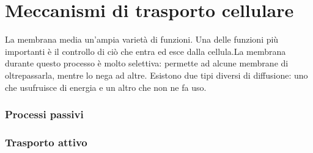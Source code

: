 \chapter{Meccanismi di trasporto cellulare}
La membrana media un'ampia varietà di funzioni. Una delle funzioni pi\`u importanti \`e il controllo di ci\`o  che entra ed esce dalla cellula.La membrana durante questo processo è molto selettiva: permette ad alcune membrane di oltrepassarla, mentre lo nega ad altre. Esistono due tipi diversi di diffusione: uno che usufruisce di energia e un altro che non ne fa uso.
\subsection{Processi passivi}
\subsection{Trasporto attivo}
